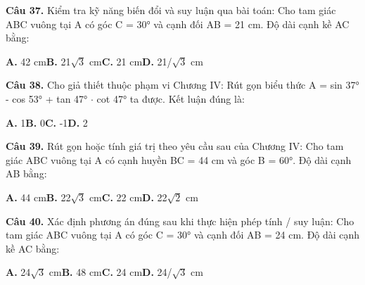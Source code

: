 \documentclass[11pt,a4paper]{article}
\begin{document}
\textbf{\color{primary} Câu 37.} Kiểm tra kỹ năng biến đổi và suy luận qua bài toán: Cho tam giác ABC vuông tại A có góc C = 30° và cạnh đối AB = 21 cm. Độ dài cạnh kề AC bằng:\par
\hspace*{1.5em}\textbf{A.} 42 cm\quad\quad \textbf{B.} 21$\sqrt{3}$ cm\quad\quad \textbf{C.} 21 cm\quad\quad \textbf{D.} 21/$\sqrt{3}$ cm\par\vspace{2pt}
\textbf{\color{primary} Câu 38.} Cho giả thiết thuộc phạm vi Chương IV: Rút gọn biểu thức A = sin 37° - cos 53° + tan 47° $\cdot$ cot 47° ta được. Kết luận đúng là:\par
\hspace*{1.5em}\textbf{A.} 1\quad\quad \textbf{B.} 0\quad\quad \textbf{C.} -1\quad\quad \textbf{D.} 2\par\vspace{2pt}
\textbf{\color{primary} Câu 39.} Rút gọn hoặc tính giá trị theo yêu cầu sau của Chương IV: Cho tam giác ABC vuông tại A có cạnh huyền BC = 44 cm và góc B = 60°. Độ dài cạnh AB bằng:\par
\hspace*{1.5em}\textbf{A.} 44 cm\quad\quad \textbf{B.} 22$\sqrt{3}$ cm\quad\quad \textbf{C.} 22 cm\quad\quad \textbf{D.} 22$\sqrt{2}$ cm\par\vspace{2pt}
\textbf{\color{primary} Câu 40.} Xác định phương án đúng sau khi thực hiện phép tính / suy luận: Cho tam giác ABC vuông tại A có góc C = 30° và cạnh đối AB = 24 cm. Độ dài cạnh kề AC bằng:\par
\hspace*{1.5em}\textbf{A.} 24$\sqrt{3}$ cm\quad\quad \textbf{B.} 48 cm\quad\quad \textbf{C.} 24 cm\quad\quad \textbf{D.} 24/$\sqrt{3}$ cm\par\vspace{2pt}
\end{document}
